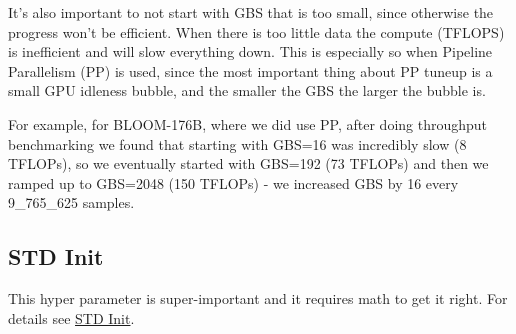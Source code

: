 \documentclass[
]{report}
\begin{document}
It's also important to not start with GBS that is too small, since
otherwise the progress won't be efficient. When there is too little data
the compute (TFLOPS) is inefficient and will slow everything down. This
is especially so when Pipeline Parallelism (PP) is used, since the most
important thing about PP tuneup is a small GPU idleness bubble, and the
smaller the GBS the larger the bubble is.

For example, for BLOOM-176B, where we did use PP, after doing throughput
benchmarking we found that starting with GBS=16 was incredibly slow (8
TFLOPs), so we eventually started with GBS=192 (73 TFLOPs) and then we
ramped up to GBS=2048 (150 TFLOPs) - we increased GBS by 16 every
9\_765\_625 samples.

\subsection{STD Init}\label{std-init}

This hyper parameter is super-important and it requires math to get it
right. For details see \href{instabilities\#std-init}{STD Init}.
\end{document}
